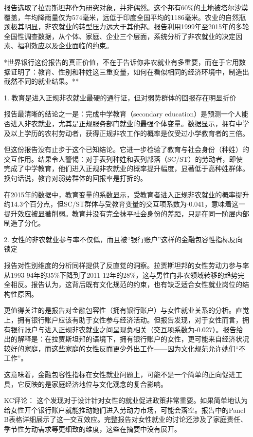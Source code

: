 \documentclass[11pt]{ctexart}
\begin{document}
报告选取了拉贾斯坦邦作为研究对象，并非偶然。这个邦有60\%的土地被塔尔沙漠覆盖，年均降雨量仅为574毫米，远低于印度全国平均的1186毫米。农业的自然瓶颈极其明显，非农就业的转型压力远大于其他邦。报告利用1999年至2015年的多轮全国性调查数据，从个体、家庭、企业三个层面，系统分析了非农就业的决定因素、福利效应以及企业面临的约束。

*世界银行这份报告的真正价值，不在于告诉你非农就业有多重要，而在于它用数据证明了：教育、性别和种姓这三重变量，如何在看似相同的经济环境中，制造出截然不同的就业结果。**

1. 教育是进入正规非农就业最硬的通行证，但对弱势群体的回报存在明显折价

报告最清晰的结论之一是：完成中学教育（secondary education）是预测一个人能否进入非农就业，尤其是正规服务部门就业的最强个体变量。数据显示，拥有中学及以上学历的农村劳动者，获得正规非农工作的概率是仅受过小学教育者的三倍。

但这份报告没有止步于这个已知结论。它进一步检验了教育与社会身份（种姓）的交互作用。结果令人警惕：对于表列种姓和表列部落（SC/ST）的劳动者，即使完成了中学教育，他们进入正规非农就业的概率提升幅度，显著低于高种姓群体。换句话说，教育对弱势群体的回报率是打折的。

在2015年的数据中，教育变量的系数显示，受教育者进入正规非农就业的概率提升约14.3个百分点，但SC/ST群体与受教育变量的交互项系数为-0.041，意味着这一提升效应被显著削弱。教育并没有完全抹平社会身份的差距，只是在同一阶层内部制造了分化。

2. 女性的非农就业参与率不仅低，而且被“银行账户”这样的金融包容性指标反向锁定

报告对性别维度的分析同样提供了反直觉的洞察。拉贾斯坦邦的女性劳动力参与率从1993-94年的35\%下降到了2011-12年的28\%，这与男性向非农领域转移的趋势完全相反。报告认为，这背后既有文化规范的约束，也有缺乏适合女性就业岗位的结构性原因。

更值得关注的是报告对金融包容性（拥有银行账户）与女性就业关系的分析。直觉上，拥有银行账户应该有助于女性参与经济活动。但报告发现，对于女性而言，拥有银行账户与进入正规非农就业之间呈现负相关（交互项系数为-0.027）。报告给出的解释是：在拉贾斯坦邦的语境下，拥有银行账户的女性，更可能来自经济状况较好的家庭，而这些家庭的女性反而更少外出工作——因为文化规范允许她们“不工作”。

这意味着，金融包容性指标在女性就业问题上，可能不是一个简单的正向促进工具，它反映的是家庭经济地位与文化观念的复合影响。

KC评论： 这个发现对于设计针对女性的就业促进政策非常重要。如果简单地认为给女性开个银行账户就能推动她们进入劳动力市场，可能会落空。报告中的Panel B表格详细展示了这一交互效应。完整报告对女性就业的讨论还涉及了家庭责任、季节性劳动需求等更细致的维度，这些在摘要中没有展开。
\end{document}
